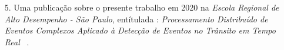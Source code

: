 \begin{itemize}
  \item[5.] Uma publicação sobre o presente trabalho em 2020 na \textit{Escola Regional de Alto Desempenho - São Paulo}, entítulada : \textit{Processamento Distribuído de Eventos Complexos Aplicado à Detecção de Eventos no Trânsito em Tempo Real} ~\citep{scattone2020cep}.

  





\end{itemize}


